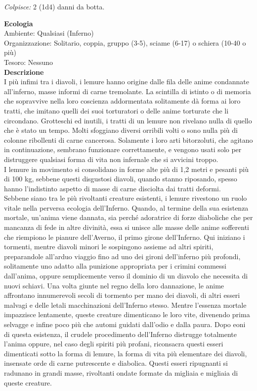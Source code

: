 \begin{multicols}{2}
\emph{Colpisce:} 2 (1d4) danni da botta.

\textbf{Ecologia}\\
Ambiente: Qualsiasi (Inferno)\\
Organizzazione: Solitario, coppia, gruppo (3-5), sciame (6-17) o schiera (10-40 o più)\\
Tesoro: Nessuno\\
\textbf{Descrizione}\\
I più infimi tra i diavoli, i lemure hanno origine dalle fila delle anime condannate all'inferno, masse informi di carne tremolante. La scintilla di istinto o di memoria che sopravvive nella loro coscienza addormentata solitamente dà forma ai loro tratti, che imitano quelli dei suoi torturatori o delle anime torturate che li circondano. Grotteschi ed inutili, i tratti di un lemure non rivelano nulla di quello che è stato un tempo. Molti sfoggiano diversi orribili volti o sono nulla più di colonne ribollenti di carne cancerosa. Solamente i loro arti bitorzoluti, che agitano in continuazione, sembrano funzionare correttamente, e vengono usati solo per distruggere qualsiasi forma di vita non infernale che si avvicini troppo.\\
I lemure in movimento si consolidano in forme alte più di 1,2 metri e pesanti più di 100 kg, sebbene questi disgustosi diavoli, quando stanno riposando, spesso hanno l'indistinto aspetto di masse di carne disciolta dai tratti deformi.\\

Sebbene siano tra le più rivoltanti creature esistenti, i lemure rivestono un ruolo vitale nella perversa ecologia dell'Inferno. Quando, al termine della sua esistenza mortale, un'anima viene dannata, sia perché adoratrice di forze diaboliche che per mancanza di fede in altre divinità, essa si unisce alle masse delle anime sofferenti che riempiono le pianure dell'Averno, il primo girone dell'Inferno. Qui iniziano i tormenti, mentre diavoli minori le sospingono assieme ad altri spiriti, preparandole all'arduo viaggio fino ad uno dei gironi dell'inferno più profondi, solitamente uno adatto alla punizione appropriata per i crimini commessi dall'anima, oppure semplicemente verso il dominio di un diavolo che necessita di nuovi schiavi. Una volta giunte nel regno della loro dannazione, le anime affrontano innumerevoli secoli di tormento per mano dei diavoli, di altri esseri malvagi e delle letali macchinazioni dell'Inferno stesso. Mentre l'essenza mortale impazzisce lentamente, queste creature dimenticano le loro vite, divenendo prima selvagge e infine poco più che automi guidati dall'odio e dalla paura. Dopo eoni di questa esistenza, il crudele procedimento dell'Inferno distrugge totalmente l'anima oppure, nel caso degli spiriti più profani, riconsacra questi esseri dimenticati sotto la forma di lemure, la forma di vita più elementare dei diavoli, insensate orde di carne putrescente e diabolica. Questi esseri ripugnanti si radunano in grandi masse, rivoltanti ondate formate da migliaia e migliaia di queste creature.\\


\end{multicols}
